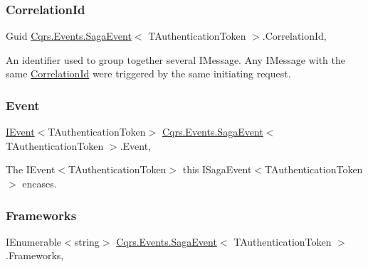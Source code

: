 \subsubsection{\texorpdfstring{Correlation\+Id}{CorrelationId}}
{\footnotesize\ttfamily Guid \hyperlink{classCqrs_1_1Events_1_1SagaEvent}{Cqrs.\+Events.\+Saga\+Event}$<$ T\+Authentication\+Token $>$.Correlation\+Id\hspace{0.3cm}{\ttfamily [get]}, {\ttfamily [set]}}



An identifier used to group together several I\+Message. Any I\+Message with the same \hyperlink{classCqrs_1_1Events_1_1SagaEvent_a3bd1014469c88b763173da28a7d5023c_a3bd1014469c88b763173da28a7d5023c}{Correlation\+Id} were triggered by the same initiating request. 

\mbox{\label{classCqrs_1_1Events_1_1SagaEvent_ad965f37f2c485f04978237f0d1be9cb7_ad965f37f2c485f04978237f0d1be9cb7}} 
\subsubsection{\texorpdfstring{Event}{Event}}
{\footnotesize\ttfamily \hyperlink{interfaceCqrs_1_1Events_1_1IEvent}{I\+Event}$<$T\+Authentication\+Token$>$ \hyperlink{classCqrs_1_1Events_1_1SagaEvent}{Cqrs.\+Events.\+Saga\+Event}$<$ T\+Authentication\+Token $>$.Event\hspace{0.3cm}{\ttfamily [get]}, {\ttfamily [set]}}



The I\+Event$<$\+T\+Authentication\+Token$>$ this I\+Saga\+Event$<$\+T\+Authentication\+Token$>$ encases. 

\mbox{\label{classCqrs_1_1Events_1_1SagaEvent_a2a52816a942f9d69a3bec20f632b853d_a2a52816a942f9d69a3bec20f632b853d}} 
\subsubsection{\texorpdfstring{Frameworks}{Frameworks}}
{\footnotesize\ttfamily I\+Enumerable$<$string$>$ \hyperlink{classCqrs_1_1Events_1_1SagaEvent}{Cqrs.\+Events.\+Saga\+Event}$<$ T\+Authentication\+Token $>$.Frameworks\hspace{0.3cm}{\ttfamily [get]}, {\ttfamily [set]}}



